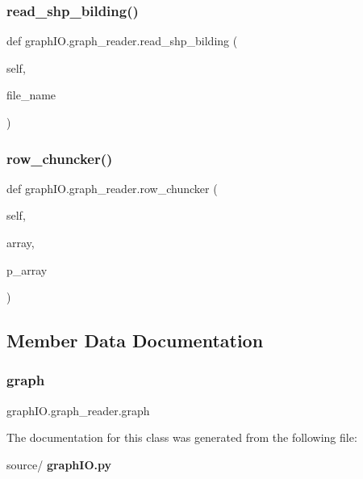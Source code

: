 \subsubsection{read\+\_\+shp\+\_\+bilding()}
{\footnotesize\ttfamily def graph\+I\+O.\+graph\+\_\+reader.\+read\+\_\+shp\+\_\+bilding (\begin{DoxyParamCaption}\item[{}]{self,  }\item[{}]{file\+\_\+name }\end{DoxyParamCaption})}

\mbox{\label{classgraph_i_o_1_1graph__reader_a4e7e90f2750cf23f970622c2109fb815}} 
\subsubsection{row\+\_\+chuncker()}
{\footnotesize\ttfamily def graph\+I\+O.\+graph\+\_\+reader.\+row\+\_\+chuncker (\begin{DoxyParamCaption}\item[{}]{self,  }\item[{}]{array,  }\item[{}]{p\+\_\+array }\end{DoxyParamCaption})}



\subsection{Member Data Documentation}
\mbox{\label{classgraph_i_o_1_1graph__reader_a3d6099f589156a7c02fd7cf6430d9500}} 
\subsubsection{graph}
{\footnotesize\ttfamily graph\+I\+O.\+graph\+\_\+reader.\+graph}



The documentation for this class was generated from the following file\+:\begin{DoxyCompactItemize}
\item 
source/\textbf{ graph\+I\+O.\+py}\end{DoxyCompactItemize}
